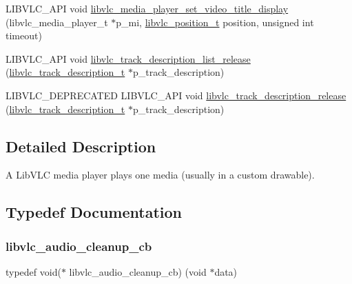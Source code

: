 \begin{DoxyCompactItemize}
\item 
L\+I\+B\+V\+L\+C\+\_\+\+A\+PI void \hyperlink{group__libvlc__media__player_gacc22e10e72cf10bc81ab3065eae96716}{libvlc\+\_\+media\+\_\+player\+\_\+set\+\_\+video\+\_\+title\+\_\+display} (libvlc\+\_\+media\+\_\+player\+\_\+t $\ast$p\+\_\+mi, \hyperlink{group__libvlc__media__player_ga948997d1c6ab5fee8051417ac7dfa1c7}{libvlc\+\_\+position\+\_\+t} position, unsigned int timeout)
\item 
L\+I\+B\+V\+L\+C\+\_\+\+A\+PI void \hyperlink{group__libvlc__media__player_gaffdae51d73f23127456631b87457beb2}{libvlc\+\_\+track\+\_\+description\+\_\+list\+\_\+release} (\hyperlink{structlibvlc__track__description__t}{libvlc\+\_\+track\+\_\+description\+\_\+t} $\ast$p\+\_\+track\+\_\+description)
\item 
L\+I\+B\+V\+L\+C\+\_\+\+D\+E\+P\+R\+E\+C\+A\+T\+ED L\+I\+B\+V\+L\+C\+\_\+\+A\+PI void \hyperlink{group__libvlc__media__player_ga952b5c8fffa72a993f0ea61bf5b5711c}{libvlc\+\_\+track\+\_\+description\+\_\+release} (\hyperlink{structlibvlc__track__description__t}{libvlc\+\_\+track\+\_\+description\+\_\+t} $\ast$p\+\_\+track\+\_\+description)
\end{DoxyCompactItemize}


\subsection{Detailed Description}
A Lib\+V\+LC media player plays one media (usually in a custom drawable). 

\subsection{Typedef Documentation}
\mbox{\label{group__libvlc__media__player_ga90303960d8c56bc1cd9902e80b011843}} 
\subsubsection{\texorpdfstring{libvlc\+\_\+audio\+\_\+cleanup\+\_\+cb}{libvlc\_audio\_cleanup\_cb}}
{\footnotesize\ttfamily typedef void($\ast$ libvlc\+\_\+audio\+\_\+cleanup\+\_\+cb) (void $\ast$data)}

